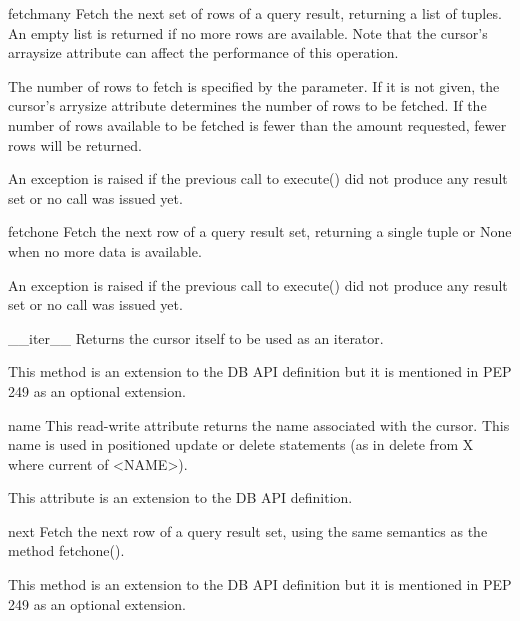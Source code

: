 \documentclass{manual}
\begin{document}
\begin{funcdesc}{fetchmany}{}
  Fetch the next set of rows of a query result, returning a list of tuples. An
  empty list is returned if no more rows are available. Note that the cursor's
  arraysize attribute can affect the performance of this operation.

  The number of rows to fetch is specified by the parameter. If it is not
  given, the cursor's arrysize attribute determines the number of rows to be
  fetched. If the number of rows available to be fetched is fewer than the
  amount requested, fewer rows will be returned.

  An exception is raised if the previous call to execute() did not produce any
  result set or no call was issued yet.
\end{funcdesc}

\begin{funcdesc}{fetchone}{}
  Fetch the next row of a query result set, returning a single tuple or None
  when no more data is available.

  An exception is raised if the previous call to execute() did not produce any
  result set or no call was issued yet.
\end{funcdesc}

\begin{funcdesc}{__iter__}{}
  Returns the cursor itself to be used as an iterator.

   This method is an extension to the DB API definition but it
  is mentioned in PEP 249 as an optional extension.
\end{funcdesc}

\begin{datadesc}{name}
  This read-write attribute returns the name associated with the cursor. This
  name is used in positioned update or delete statements (as in delete from X
  where current of <NAME>).

   This attribute is an extension to the DB API definition.
\end{datadesc}

\begin{funcdesc}{next}{}
  Fetch the next row of a query result set, using the same semantics as
  the method fetchone().

   This method is an extension to the DB API definition but it
  is mentioned in PEP 249 as an optional extension.
\end{funcdesc}
\end{document}
